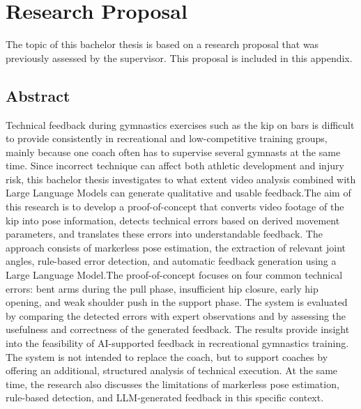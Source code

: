 \documentclass[english,dit,thesis]{hogentreport}
\begin{document}






%
%




\appendix

\chapter{Research Proposal}

The topic of this bachelor thesis is based on a research proposal that was previously assessed by the supervisor. This proposal is included in this appendix.

\section*{Abstract}

Technical feedback during gymnastics exercises such as the kip on bars is difficult to provide consistently in recreational and low-competitive training groups, mainly because one coach often has to supervise several gymnasts at the same time. Since incorrect technique can affect both athletic development and injury risk, this bachelor thesis investigates to what extent video analysis combined with Large Language Models can generate qualitative and usable feedback.The aim of this research is to develop a proof-of-concept that converts video footage of the kip into pose information, detects technical errors based on derived movement parameters, and translates these errors into understandable feedback. The approach consists of markerless pose estimation, the extraction of relevant joint angles, rule-based error detection, and automatic feedback generation using a Large Language Model.The proof-of-concept focuses on four common technical errors: bent arms during the pull phase, insufficient hip closure, early hip opening, and weak shoulder push in the support phase. The system is evaluated by comparing the detected errors with expert observations and by assessing the usefulness and correctness of the generated feedback. The results provide insight into the feasibility of AI-supported feedback in recreational gymnastics training. The system is not intended to replace the coach, but to support coaches by offering an additional, structured analysis of technical execution. At the same time, the research also discusses the limitations of markerless pose estimation, rule-based detection, and LLM-generated feedback in this specific context. 
\end{document}
